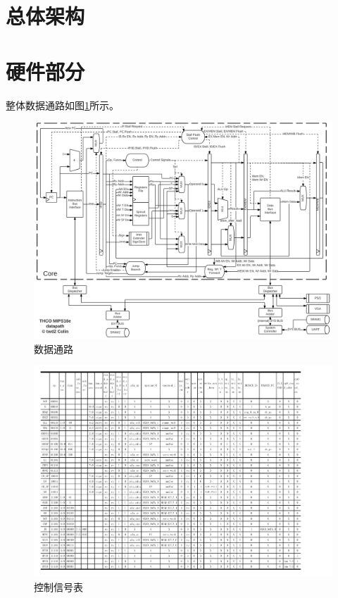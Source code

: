 \documentclass[11pt,utf8]{report}
\begin{document}
\section{总体架构}

\section{硬件部分}

	整体数据通路如图\ref{datapath}所示。

	\begin{figure}[H]
		\centering
		\setlength{\leftskip}{-40pt}
		\includegraphics[width=1.2\textwidth]{datapath}
		\caption{数据通路}
		\label{datapath}
	\end{figure}

	\begin{center}
	\begin{figure}[H]
			\centering
			\setlength{\leftskip}{-40pt}
			\includegraphics[width=1.2\textwidth]{control.pdf}
			\caption{控制信号表}
		\end{figure}
	\end{center}
\end{document}
